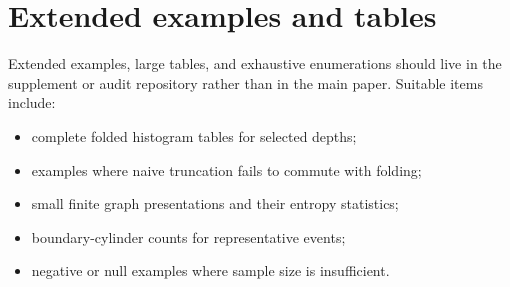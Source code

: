 \section{Extended examples and tables}
\label{app:extended-examples}

Extended examples, large tables, and exhaustive enumerations should live in the supplement or audit repository rather than in the main paper.  Suitable items include:
\begin{itemize}
\item complete folded histogram tables for selected depths;
\item examples where naive truncation fails to commute with folding;
\item small finite graph presentations and their entropy statistics;
\item boundary-cylinder counts for representative events;
\item negative or null examples where sample size is insufficient.
\end{itemize}
